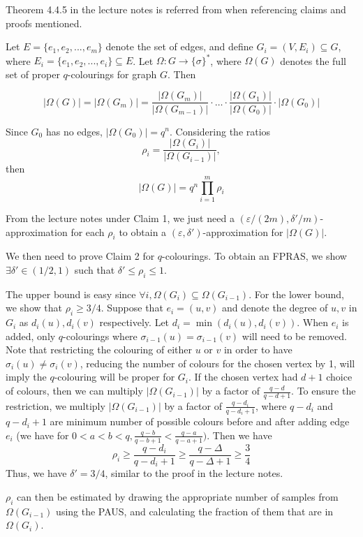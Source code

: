 \documentclass[11pt]{article} %
\begin{document}
Theorem 4.4.5 in the lecture notes is referred from when referencing claims and proofs mentioned.

Let $E=\{e_1,e_2,...,e_m\}$ denote the set of edges, and define $G_i = (V,E_i)\subseteq G$,
where $E_i=\{e_1,e_2,...,e_i\}\subseteq E$. 
Let $\Omega: G \rightarrow \{\sigma\}^*$, 
where $\Omega(G)$ denotes the full set of proper $q$-colourings for graph $G$. Then

\[|\Omega(G)|=|\Omega(G_m)|
=\frac{|\Omega(G_m)|}{|\Omega(G_{m-1})|}\cdot\dots\cdot\frac{|\Omega(G_1)|}{|\Omega(G_0)|}\cdot |\Omega(G_0)|\]

Since $G_0$ has no edges, $|\Omega(G_0)| = q^n$. Considering the ratios
\[\rho_i = \frac{|\Omega(G_i)|}{|\Omega(G_{i-1})|},\]
then
\[|\Omega(G)|=q^n\prod_{i=1}^m \rho_i\]

From the lecture notes under Claim 1, 
we just need a $(\varepsilon/(2m), \delta'/m)$-approximation for each $\rho_i$
to obtain a $(\varepsilon,\delta')$-approximation for $|\Omega(G)|$.

We then need to prove Claim 2 for $q$-colourings.
To obtain an FPRAS, we show $\exists\delta'\in (1/2,1)$ such that $\delta' \leq \rho_i \leq 1$.

The upper bound is easy since $\forall i, \Omega(G_i)\subseteq \Omega(G_{i-1})$.
For the lower bound, we show that $\rho_i \geq 3/4$.
Suppose that $e_i=(u,v)$ and denote the degree of $u,v$ in $G_i$ as $d_i(u),d_i(v)$ respectively.
Let $d_i = \min(d_i(u),d_i(v))$.
When $e_i$ is added, only $q$-colourings where $\sigma_{i-1}(u)=\sigma_{i-1}(v)$ will need to be removed.
Note that restricting the colouring of either $u$ or $v$ 
in order to have $\sigma_i(u)\neq\sigma_i(v)$, reducing the number of colours for the chosen vertex by 1,
will imply the $q$-colouring will be proper for $G_i$.
If the chosen vertex had $d+1$ choice of colours, 
then we can multiply $|\Omega(G_{i-1})|$ by a factor of $\frac{q-d}{q-d+1}$.
To ensure the restriction, we multiply $|\Omega(G_{i-1})|$ by a factor of $\frac{q-d_i}{q-d_i+1}$,
where $q-d_i$ and $q-d_i+1$ are minimum number of possible colours before and after adding edge $e_i$
(we have for $ 0 < a< b < q, \frac{q-b}{q-b+1}<\frac{q-a}{q-a+1})$.
Then we have
\[\rho_i \geq \frac{q-d_i}{q-d_i+1}\geq \frac{q-\Delta}{q-\Delta+1} \geq \frac{3}{4}\]
Thus, we have $\delta'=3/4$, similar to the proof in the lecture notes.



$\rho_i$ can then be estimated by drawing the appropriate number of samples from $\Omega(G_{i-1})$ using the PAUS,
and calculating the fraction of them that are in $\Omega(G_i)$.
\end{document}
